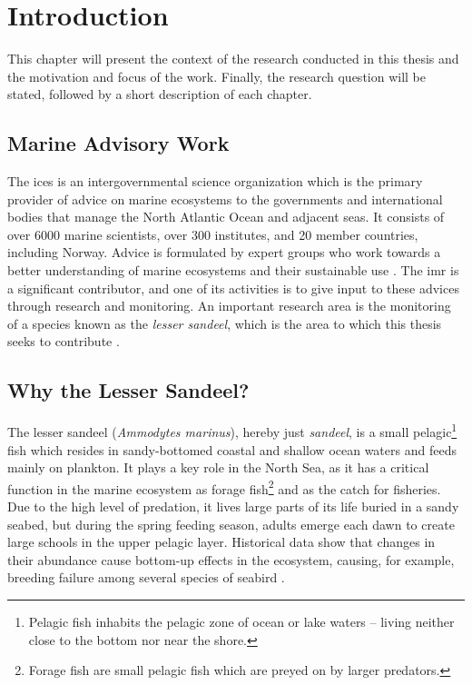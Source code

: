 \chapter{Introduction}
    This chapter will present the context of the research conducted in this thesis and the motivation and focus of the work. Finally, the research question will be stated, followed by a short description of each chapter. 
    
    
    

\section{Marine Advisory Work}
    The \gls{ices} is an intergovernmental science organization which is the primary provider of advice on marine ecosystems to the governments and international bodies that manage the North Atlantic Ocean and adjacent seas. It consists of over 6000 marine scientists, over 300 institutes, and 20 member countries, including Norway. Advice is formulated by expert groups who work towards a better understanding of marine ecosystems and their sustainable use \cite{ICES2020}. The \gls{imr} is a significant  contributor, and one of its activities is to give input to these advices through research and monitoring. An important research area is the monitoring of a species known as the \textit{lesser sandeel}, which is the area to which this thesis seeks to contribute \cite{IMR}.
    
\section{Why the Lesser Sandeel?}
    The lesser sandeel (\textit{Ammodytes marinus}), hereby just \textit{sandeel}, is
    a small pelagic\footnote{Pelagic fish inhabits the pelagic zone of ocean or lake waters – living neither close to the bottom nor near the shore.} fish which resides in sandy-bottomed coastal and shallow ocean waters and feeds mainly on plankton. It plays a key role in the North Sea, as it has a critical function in the marine ecosystem as forage fish\footnote{Forage fish are small pelagic fish which are preyed on by larger predators.} and as the catch for fisheries. Due to the high level of predation, it lives large parts of its life buried in a sandy seabed, but during the spring feeding season, adults emerge each dawn to create large schools in the upper pelagic layer. Historical data show that changes in their abundance cause bottom-up effects in the ecosystem, causing, for example, breeding failure among several species of seabird \cite{johnsen2017collective}. 
    
